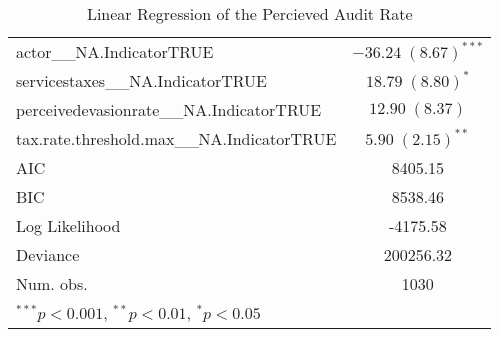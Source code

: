 \begin{table}
\begin{tabular}{l c }
actor\_\_NA.IndicatorTRUE                  & $-36.24 \; (8.67)^{***}$ \\
servicestaxes\_\_NA.IndicatorTRUE          & $18.79 \; (8.80)^{*}$    \\
perceivedevasionrate\_\_NA.IndicatorTRUE   & $12.90 \; (8.37)$        \\
tax.rate.threshold.max\_\_NA.IndicatorTRUE & $5.90 \; (2.15)^{**}$    \\
\hline
AIC                                        & 8405.15                  \\
BIC                                        & 8538.46                  \\
Log Likelihood                             & -4175.58                 \\
Deviance                                   & 200256.32                \\
Num. obs.                                  & 1030                     \\
\hline
\multicolumn{2}{l}{\scriptsize{$^{***}p<0.001$, $^{**}p<0.01$, $^*p<0.05$}}
\end{tabular}
\caption{Linear Regression of the Percieved Audit Rate}
\label{table:coefficients}
\end{table}
